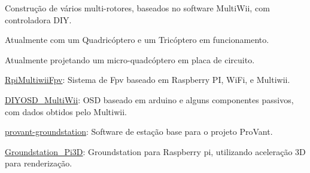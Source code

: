 \documentclass[letterpaper]{deedy-resume} %
\begin{document}
\begin{minipage}[t]{0.66\textwidth}
\sectionspace

\location{   }
\begin{tightitemize}
   \item Construção de vários multi-rotores, baseados no software MultiWii, com controladora DIY.
\item Atualmente com um Quadricóptero e um Tricóptero em funcionamento.   
\item Atualmente projetando um micro-quadcóptero em placa de circuito.

\end{tightitemize}

\sectionspace

\location{    }
\begin{tightitemize}
\item \href{https://github.com/Williangalvani/RpiMultiwiiFpv}{RpiMultiwiiFpv}: Sistema de Fpv baseado em Raspberry PI, WiFi, e Multiwii. 

\item \href{https://github.com/Williangalvani/diyosd\_multiwii}{DIYOSD\_MultiWii}: OSD baseado em arduino e alguns componentes passivos, com dados obtidos pelo Multiwii.

\item \href{https://github.com/patrickelectric/provant-groundstation}{provant-groundstation}: Software de estação base para o projeto ProVant.

\item \href{https://github.com/Williangalvani/groundstation\_pi3d}{Groundstation\_Pi3D}: Groundstation para Raspberry pi, utilizando aceleração 3D para renderização.

\end{tightitemize}



\end{minipage} %

\end{document}

